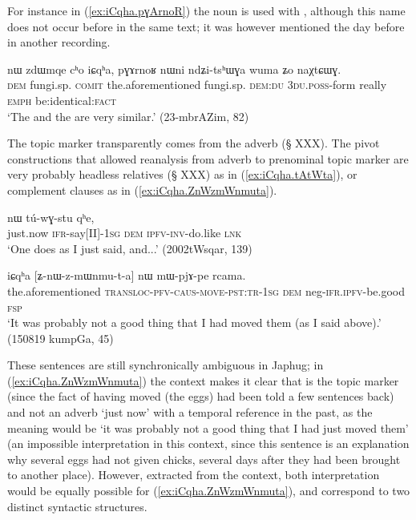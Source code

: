 For instance in (\ref{ex:iCqha.pɣArnoR}) the noun  is used with , although this name does not occur before in the same text; it was however mentioned the day before in another recording.

\begin{exe}
\ex \label{ex:iCqha.pɣArnoR}
\gll nɯ zdɯmqe cʰo iɕqʰa, pɣɤrnoʁ nɯni ndʑi-tsʰɯɣa wuma ʑo naχtɕɯɣ. \\
\textsc{dem} fungi.sp. \textsc{comit} the.aforementioned fungi.sp. \textsc{dem}:\textsc{du} \textsc{3du}.\textsc{poss}-form really \textsc{emph} be:identical:\textsc{fact} \\
\glt `The  and the  are very similar.' (23-mbrAZim, 82)
\end{exe}

 
The topic marker  transparently comes from the adverb  (§ XXX). The pivot constructions that allowed reanalysis from adverb to prenominal topic marker are very probably headless relatives (§ XXX) as in  (\ref{ex:iCqha.tAtWta}), or complement clauses as in (\ref{ex:iCqha.ZnWzmWnmuta}). 

\begin{exe}
\ex \label{ex:iCqha.tAtWta}
  nɯ tú-wɣ-stu qʰe, \\
 just.now \textsc{ifr}-say[II]-\textsc{1sg} \textsc{dem} \textsc{ipfv}-\textsc{inv}-do.like \textsc{lnk} \\
\glt `One does as I just said, and...' (2002tWsqar, 139)
\end{exe}

\begin{exe}
\ex \label{ex:iCqha.ZnWzmWnmuta}
 \gll iɕqʰa [ʑ-nɯ-z-mɯnmu-t-a] nɯ mɯ-pjɤ-pe rcama.  \\
the.aforementioned  \textsc{transloc}-\textsc{pfv}-\textsc{caus}-\textsc{move}-\textsc{pst}:\textsc{tr}-\textsc{1sg} \textsc{dem} neg-\textsc{ifr}.\textsc{ipfv}-be.good \textsc{fsp} \\
\glt `It was probably not a good thing that I had moved them (as I said above).' (150819 kumpGa, 45)
 \end{exe}
 
 These sentences are still synchronically ambiguous in Japhug; in  (\ref{ex:iCqha.ZnWzmWnmuta}) the context makes it clear that  is the topic marker (since the fact of having moved (the eggs) had been told a few sentences back) and not an adverb `just now' with a temporal reference in the past, as the meaning would be `it was probably not a good thing that I had just moved them' (an impossible interpretation in this context, since this sentence is an explanation why several eggs had not given chicks, several days after they had been brought to another place). However, extracted from the context, both interpretation would be equally possible for (\ref{ex:iCqha.ZnWzmWnmuta}), and correspond to two distinct syntactic structures.

